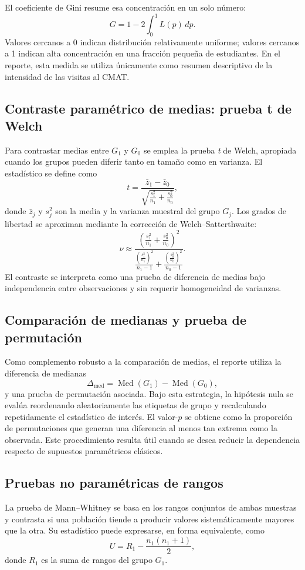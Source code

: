 \documentclass[10pt,letterpaper]{article} %
\numberwithin{figure}{subsection}
\begin{document}
El coeficiente de Gini resume esa concentración en un solo número:
\[
G = 1 - 2\int_0^1 L(p)\,dp.
\]
Valores cercanos a 0 indican distribución relativamente uniforme; valores cercanos a 1 indican alta concentración en una fracción pequeña de estudiantes. En el reporte, esta medida se utiliza únicamente como resumen descriptivo de la intensidad de las visitas al CMAT.

\subsection{Contraste paramétrico de medias: prueba t de Welch}
Para contrastar medias entre $G_1$ y $G_0$ se emplea la prueba \textit{t} de Welch, apropiada cuando los grupos pueden diferir tanto en tamaño como en varianza. El estadístico se define como
\[
t=\frac{\bar z_1-\bar z_0}{\sqrt{\frac{s_1^2}{n_1}+\frac{s_0^2}{n_0}}},
\]
donde $\bar z_j$ y $s_j^2$ son la media y la varianza muestral del grupo $G_j$. Los grados de libertad se aproximan mediante la corrección de Welch--Satterthwaite:
\[
\nu \approx
\frac{\left(\frac{s_1^2}{n_1}+\frac{s_0^2}{n_0}\right)^2}
{\frac{\left(\frac{s_1^2}{n_1}\right)^2}{n_1-1}+\frac{\left(\frac{s_0^2}{n_0}\right)^2}{n_0-1}}.
\]
El contraste se interpreta como una prueba de diferencia de medias bajo independencia entre observaciones y sin requerir homogeneidad de varianzas.

\subsection{Comparación de medianas y prueba de permutación}
Como complemento robusto a la comparación de medias, el reporte utiliza la diferencia de medianas
\[
\Delta_{\mathrm{med}}=\operatorname{Med}(G_1)-\operatorname{Med}(G_0),
\]
y una prueba de permutación asociada. Bajo esta estrategia, la hipótesis nula se evalúa reordenando aleatoriamente las etiquetas de grupo y recalculando repetidamente el estadístico de interés. El valor-$p$ se obtiene como la proporción de permutaciones que generan una diferencia al menos tan extrema como la observada. Este procedimiento resulta útil cuando se desea reducir la dependencia respecto de supuestos paramétricos clásicos.

\subsection{Pruebas no paramétricas de rangos}
La prueba de Mann--Whitney se basa en los rangos conjuntos de ambas muestras y contrasta si una población tiende a producir valores sistemáticamente mayores que la otra. Su estadístico puede expresarse, en forma equivalente, como
\[
U = R_1-\frac{n_1(n_1+1)}{2},
\]
donde $R_1$ es la suma de rangos del grupo $G_1$.
\end{document}
